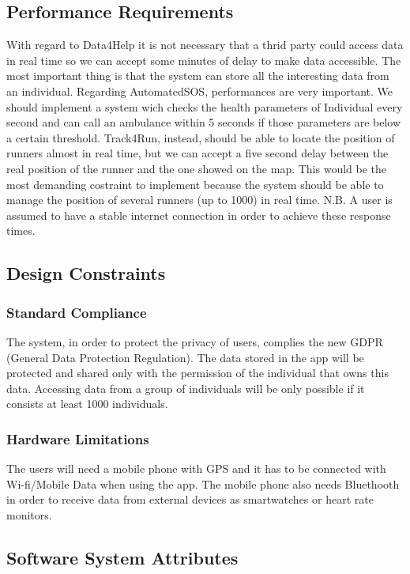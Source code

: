 \documentclass[12pt]{article}
\begin{document}
\subsection{Performance Requirements}
With regard to Data4Help it is not necessary that a thrid party could access data in real time so we can accept some minutes of delay to make data accessible. The most important thing is that the system can store all the interesting data from an individual. Regarding AutomatedSOS, performances are very important. We should implement a system wich checks the health parameters of Individual every second and can call an ambulance within 5 seconds if those parameters are below a certain threshold. Track4Run, instead, should be able to locate the position of runners almost in real time, but we can accept a five second delay between the real position of the runner and the one showed on the map. This would be the most demanding costraint to implement because the system should be able to manage the position of several runners (up to 1000) in real time. 
\vspace{2mm}
\newline
N.B. A user is assumed to have a stable internet connection in order to achieve these response times.

\subsection{Design Constraints}
\subsubsection{Standard Compliance}
The system, in order to protect the privacy of users, complies the new GDPR (General Data Protection Regulation). The data stored in the app will be protected and shared only with the permission of the individual that owns this data. Accessing data from a group of individuals will be only possible if it consists at least 1000 individuals.

\subsubsection{Hardware Limitations}
The users will need a mobile phone with GPS and it has to be connected with Wi-fi/Mobile Data when using the app. The mobile phone also needs Bluethooth in order to receive data from external devices as smartwatches or heart rate monitors.   

\subsection{Software System Attributes}
\end{document}
